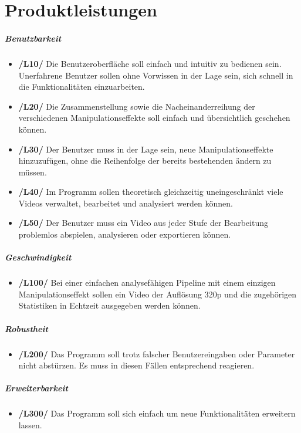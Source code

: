 \section{Produktleistungen}

\subparagraph{Benutzbarkeit}
\begin{itemize}
	\item \textbf{/L10/} Die Benutzeroberfläche soll einfach und intuitiv zu bedienen sein. Unerfahrene Benutzer sollen ohne Vorwissen in der Lage sein, sich schnell in die Funktionalitäten einzuarbeiten.
	\item \textbf{/L20/} Die Zusammenstellung sowie die Nacheinanderreihung der verschiedenen Manipulationseffekte soll einfach und übersichtlich geschehen können. 
	\item \textbf{/L30/} Der Benutzer muss in der Lage sein, neue Manipulationseffekte hinzuzufügen, ohne die Reihenfolge der bereits bestehenden ändern zu müssen.
	\item \textbf{/L40/} Im Programm sollen theoretisch gleichzeitig uneingeschränkt viele Videos verwaltet, bearbeitet und analysiert werden können.
	\item \textbf{/L50/} Der Benutzer muss ein Video aus jeder Stufe der Bearbeitung problemlos abspielen, analysieren oder exportieren können.
\end{itemize}

\subparagraph{Geschwindigkeit}

\begin{itemize}
	\item \textbf{/L100/} Bei einer einfachen analysefähigen Pipeline mit einem einzigen Manipulationseffekt sollen ein Video der Auflösung 320p und die zugehörigen Statistiken in Echtzeit ausgegeben werden können.
\end{itemize}

\subparagraph{Robustheit}

\begin{itemize}
	\item \textbf{/L200/} Das Programm soll trotz falscher Benutzereingaben oder Parameter nicht abstürzen. Es muss in diesen Fällen entsprechend reagieren.
\end{itemize}

\subparagraph{Erweiterbarkeit}

\begin{itemize}
	\item \textbf{/L300/} Das Programm soll sich einfach um neue Funktionalitäten erweitern lassen.
\end{itemize}

 
